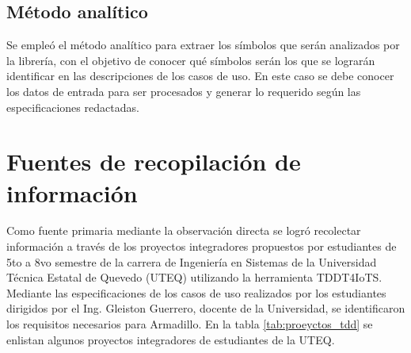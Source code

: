 
\subsection{Método analítico}
Se empleó el método analítico para extraer los símbolos que serán analizados por la librería, con el objetivo de conocer qué símbolos serán los que se lograrán identificar en las descripciones de los casos de uso. En este caso se debe conocer los datos de entrada para ser procesados y generar lo requerido según las especificaciones redactadas.

\section{Fuentes de recopilación de información}

Como fuente primaria mediante la observación directa se logró recolectar información a través de los proyectos integradores propuestos por estudiantes de 5to a 8vo semestre de la carrera de Ingeniería en Sistemas de la Universidad Técnica Estatal de Quevedo (UTEQ) utilizando la herramienta TDDT4IoTS. Mediante las especificaciones de los casos de uso realizados por los estudiantes dirigidos por el Ing. Gleiston Guerrero, docente de la Universidad, se identificaron los requisitos necesarios para Armadillo. En la tabla \ref{tab:proeyctos_tdd} se enlistan algunos proyectos integradores de estudiantes de la UTEQ.

